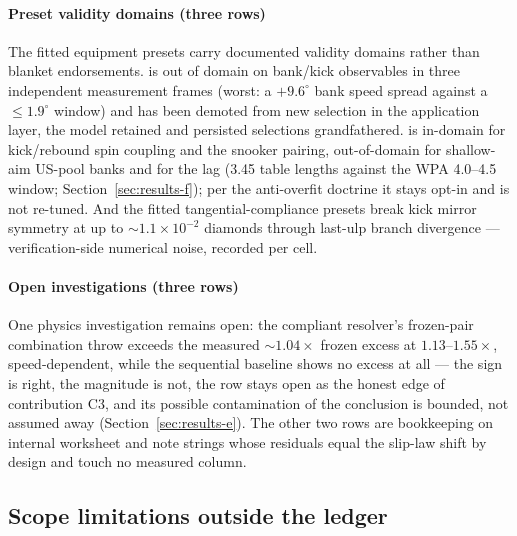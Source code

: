 \paragraph{Preset validity domains (three rows)}
The fitted equipment presets carry documented validity domains rather
than blanket endorsements.  is out of domain on
bank/kick observables in three independent measurement frames (worst: a
$+9.6^\circ$ bank speed spread against a $\leq 1.9^\circ$ window) and
has been demoted from new selection in the application layer, the model
retained and persisted selections grandfathered.  is in-domain for
kick/rebound spin coupling and the snooker pairing, out-of-domain for
shallow-aim US-pool banks and for the lag (3.45 table lengths against
the WPA 4.0--4.5 window; Section~\ref{sec:results-f}); per the
anti-overfit doctrine it stays opt-in and is not re-tuned. And the fitted tangential-compliance
presets break kick mirror symmetry at up to $\sim 1.1\times10^{-2}$
diamonds through last-ulp branch divergence --- verification-side
numerical noise, recorded per cell.

\paragraph{Open investigations (three rows)}
One physics investigation remains open: the compliant resolver's
frozen-pair combination throw exceeds the measured $\sim 1.04\times$
frozen excess at $1.13$--$1.55\times$, speed-dependent, while the
sequential baseline shows no excess at all --- the sign is right, the
magnitude is not, the row stays open as the honest
edge of contribution C3, and its possible contamination of the
 conclusion is bounded, not assumed away
(Section~\ref{sec:results-e}). The
other two rows are bookkeeping on internal worksheet and note strings
whose residuals equal the slip-law shift by design and touch no measured
column.

\subsection{Scope limitations outside the ledger}

